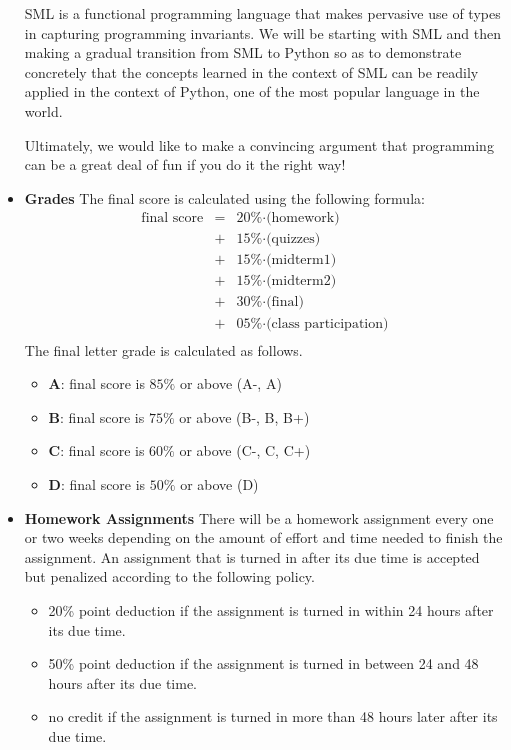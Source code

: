 \documentclass[11pt]{article}
\begin{document}
\begin{itemize}
SML is a functional programming language that makes pervasive use of
types in capturing programming invariants. We will be starting with
SML and then making a gradual transition from SML to Python so as to
demonstrate concretely that the concepts learned in the context of SML
can be readily applied in the context of Python, one of the most
popular language in the world.

Ultimately, we would like to make a convincing argument that programming
can be a great deal of fun if you do it the right way!

\item {\bf Grades}
The final score is calculated using the following formula:
\[\begin{array}{rcl}
\mbox{final score} & = & \mbox{20\%$\cdot$(homework)} \\
                   & + & \mbox{15\%$\cdot$(quizzes)} \\
                   & + & \mbox{15\%$\cdot$(midterm1)} \\
                   & + & \mbox{15\%$\cdot$(midterm2)} \\
                   & + & \mbox{30\%$\cdot$(final)} \\
                   & + & \mbox{05\%$\cdot$(class participation)} \\
\end{array}\]
The final letter grade is calculated as follows.
\begin{itemize}
\item{\bf A}: final score is $85\%$ or above (A-, A)
\item{\bf B}: final score is $75\%$ or above (B-, B, B+)
\item{\bf C}: final score is $60\%$ or above (C-, C, C+)
\item{\bf D}: final score is $50\%$ or above (D)
\end{itemize}

\item{\bf Homework Assignments}
There will be a homework assignment every one or two weeks depending on the
amount of effort and time needed to finish the assignment. An assignment that
is turned in after its due time is accepted but penalized according to the
following policy.
\begin{itemize}
\item 20\% point deduction if the assignment is turned in within 24 hours
after its due time.
\item 50\% point deduction if the assignment is turned in between 24 and 48 hours
after its due time.
\item no credit if the assignment is turned in more than 48 hours later after its due time.
\end{itemize}


\end{itemize}
\end{document}
